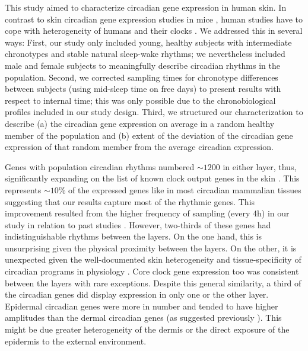\normalsize

This study aimed to characterize circadian gene expression in human skin. In contrast to skin circadian gene expression studies in mice \cite{Geyfman2012}, human studies have to cope with heterogeneity of humans and their clocks \cite{Roenneberg2007}. We addressed this in several ways: First, our study only included young, healthy subjects with intermediate chronotypes and stable natural sleep-wake rhythms; we nevertheless included male and female subjects to meaningfully describe circadian rhythms in the population. Second, we corrected sampling times for chronotype differences between subjects (using mid-sleep time on free days) to present results with respect to internal time; this was only possible due to the chronobiological profiles included in our study design. Third, we structured our characterization to describe (a) the circadian gene expression on average in a random healthy member of the population and  (b) extent of the deviation of the circadian gene expression of that random member from the average circadian expression.

Genes with population circadian rhythms numbered $\sim 1200$ in either layer, thus, significantly expanding on the list of known clock output genes in the skin \cite{Wu2018,Wu2020}. This represents $\sim 10$\% of the expressed genes like in most circadian mammalian tissues \cite{Zhang2014,Ruben2018} suggesting that our results capture most of the rhythmic genes. This improvement resulted from the higher frequency of sampling (every 4h) in our study in relation to past studies \cite{Spoerl2012,Wu2018,Wu2020}. However, two-thirds of these genes had indistinguishable rhythms between the layers. On the one hand, this is unsurprising given the physical proximity between the layers. On the other, it is unexpected given the well-documented skin heterogeneity \cite{Duan2021} and tissue-specificity of circadian programs in physiology \cite{Ruben2018}. Core clock gene expression too was consistent between the layers with rare exceptions. Despite this general similarity, a third of the circadian genes did display expression in only one or the other layer. Epidermal circadian genes were more in number and tended to have higher amplitudes than the dermal circadian genes (as suggested previously \cite{Wu2020}). This might be due greater heterogeneity of the dermis or the direct exposure of the epidermis to the external environment.

